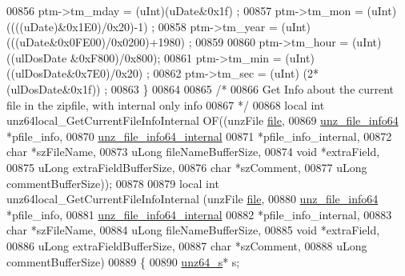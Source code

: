 \begin{DoxyCode}
00856     ptm->tm\_mday = (uInt)(uDate&0x1f) ;
00857     ptm->tm\_mon =  (uInt)((((uDate)&0x1E0)/0x20)-1) ;
00858     ptm->tm\_year = (uInt)(((uDate&0x0FE00)/0x0200)+1980) ;
00859 
00860     ptm->tm\_hour = (uInt) ((ulDosDate &0xF800)/0x800);
00861     ptm->tm\_min =  (uInt) ((ulDosDate&0x7E0)/0x20) ;
00862     ptm->tm\_sec =  (uInt) (2*(ulDosDate&0x1f)) ;
00863 \}
00864 
00865 \textcolor{comment}{/*}
00866 \textcolor{comment}{  Get Info about the current file in the zipfile, with internal only info}
00867 \textcolor{comment}{*/}
00868 local \textcolor{keywordtype}{int} unz64local\_GetCurrentFileInfoInternal OF((unzFile \hyperlink{structfile}{file},
00869                                                   \hyperlink{structunz__file__info64__s}{unz\_file\_info64} *pfile\_info,
00870                                                   \hyperlink{structunz__file__info64__internal__s}{unz\_file\_info64\_internal}
00871                                                   *pfile\_info\_internal,
00872                                                   \textcolor{keywordtype}{char} *szFileName,
00873                                                   uLong fileNameBufferSize,
00874                                                   \textcolor{keywordtype}{void} *extraField,
00875                                                   uLong extraFieldBufferSize,
00876                                                   \textcolor{keywordtype}{char} *szComment,
00877                                                   uLong commentBufferSize));
00878 
00879 local \textcolor{keywordtype}{int} unz64local\_GetCurrentFileInfoInternal (unzFile \hyperlink{structfile}{file},
00880                                                   \hyperlink{structunz__file__info64__s}{unz\_file\_info64} *pfile\_info,
00881                                                   \hyperlink{structunz__file__info64__internal__s}{unz\_file\_info64\_internal}
00882                                                   *pfile\_info\_internal,
00883                                                   \textcolor{keywordtype}{char} *szFileName,
00884                                                   uLong fileNameBufferSize,
00885                                                   \textcolor{keywordtype}{void} *extraField,
00886                                                   uLong extraFieldBufferSize,
00887                                                   \textcolor{keywordtype}{char} *szComment,
00888                                                   uLong commentBufferSize)
00889 \{
00890     \hyperlink{structunz64__s}{unz64\_s}* s;

\end{DoxyCode}
